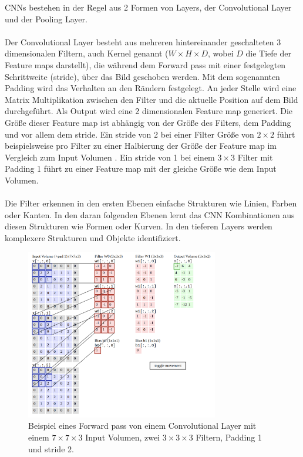 \gls{CNN}s bestehen in der Regel aus 2 Formen von \gls{Layer}s, der Convolutional \gls{Layer} und der Pooling Layer. 
\\
\\
Der Convolutional \gls{Layer} besteht aus mehreren hintereinander geschalteten 3 dimensionalen
Filtern, auch Kernel genannt ($ W \times H \times D$, wobei $D$ die Tiefe der Feature maps darstellt), die während dem Forward pass mit 
einer festgelegten Schrittweite (\gls{stride}), über das Bild geschoben werden. Mit dem sogenannten Padding wird das Verhalten an den Rändern festgelegt.
An jeder Stelle wird eine Matrix Multiplikation zwischen den Filter und die aktuelle Position auf dem Bild durchgeführt. 
Als Output wird eine 2 dimensionalen Feature map generiert. Die Größe dieser Feature map ist abhängig 
von der Größe des Filters, dem Padding und vor allem dem \gls{stride}. Ein \gls{stride} von 2 bei einer Filter Größe von $ 2\times2 $ führt beispielsweise 
pro Filter zu einer Halbierung der Größe der Feature map im Vergleich zum Input Volumen \cite{aufbau-funktion-convnet}.
Ein \gls{stride} von 1 bei einem $ 3\times3 $ Filter mit Padding 1 führt zu einer Feature map mit der gleiche Größe wie dem Input Volumen.
\\
\\
Die Filter erkennen in den ersten Ebenen einfache Strukturen wie Linien, Farben oder Kanten. In den daran folgenden Ebenen lernt das CNN Kombinationen aus 
diesen Strukturen wie Formen oder Kurven. In den tieferen \gls{Layer}s werden komplexere Strukturen und Objekte identifiziert. 

\begin{figure}[H]
  \centering
  \includegraphics[width=0.75\textwidth]{resources/cnn/funktion-cnn.png}
  \caption{
    Beispiel eines Forward pass von einem Convolutional \gls{Layer} mit einem $ 7\times7\times3 $ Input Volumen, zwei $3\times3\times3$ Filtern, 
    Padding 1 und \gls{stride} 2.
    \cite{convnet-demo}
  }
  \label{image:convnet-demo}
\end{figure}

